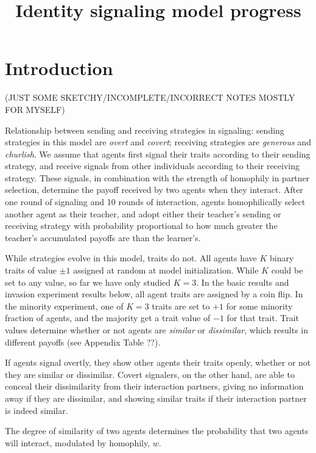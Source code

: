 \documentclass[11pt,letterpaper]{article}
\title{\vspace{-1in}Identity signaling model progress}
\author{} %
\begin{document}
\maketitle
\tableofcontents

\section{Introduction}

(JUST SOME SKETCHY/INCOMPLETE/INCORRECT NOTES MOSTLY FOR MYSELF)

Relationship between sending and receiving strategies in signaling: 
sending strategies in this model are \emph{overt} and \emph{covert}; 
receiving strategies are \emph{generous} and \emph{churlish}. We assume
that agents first signal their traits according to their sending strategy,
and receive signals from other individuals according to their receiving
strategy. These signals, in combination with the strength of homophily in
partner selection, determine the payoff received by two agents when they
interact. After one round of signaling and 10 rounds of interaction, agents
homophilically select another agent as their teacher, and adopt either their 
teacher's sending or receiving strategy with probability proportional to how
much greater the teacher's accumulated payoffs are than the learner's. 

While strategies evolve in this model, traits do not. All agents have 
$K$ binary traits of value $\pm1$ assigned at random at model initialization.
While $K$ could be set to any value, so far we have only studied $K=3$.
In the basic results and invasion experiment results below, all agent traits
are assigned by a coin flip. In the minority experiment, one of $K=3$ traits
are set to $+1$ for some minority fraction of agents, and the majority 
get a trait value of $-1$ for that trait. Trait values determine whether or
not agents are \emph{similar} or \emph{dissimilar}, which results in 
different payoffs (see Appendix Table ??). 

If agents signal overtly, they show other agents their traits openly, whether or
not they are similar or dissimilar. Covert signalers, on the other hand, 
are able to conceal their dissimilarity from their interaction partners, 
giving no information away if they are dissimilar, and showing similar traits
if their interaction partner is indeed similar. 

The degree of similarity of two agents determines the probability that two 
agents will interact, modulated by homophily, $w$.
\end{document}
